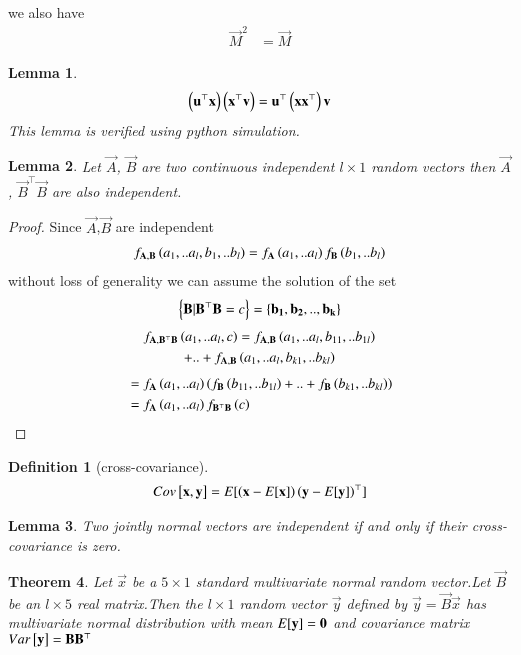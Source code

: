 \documentclass[journal,12pt,twocolumn]{IEEEtran}
\newtheorem{theorem}{Theorem}[section]
\newtheorem{lemma}[theorem]{Lemma}
\newtheorem{definition}{Definition}[section]
\begin{document}
we also have 
\begin{align}
    \vec{M}^2&=\vec{M}
\end{align}
\begin{lemma}
\label{l2.1}
\begin{align}
   \left(\mathbf{u}^{\top}\mathbf{x}\right)\left(\mathbf{x}^{\top}\mathbf{v}\right)=\mathbf{u}^{\top}\left(\mathbf{x}\mathbf{x}^{\top}\right)\mathbf{v}
\end{align}
This lemma is verified using python simulation.
\end{lemma}
\begin{lemma}
\label{l2.2}
Let $\vec{A}$, $\vec{B}$ are two continuous independent $l\times 1$ random vectors then $\vec{A}$, $\vec{B}^{\top}\vec{B}$ are also independent.
\end{lemma}
\begin{proof}
Since $\vec{A}$,$\vec{B}$ are independent
\begin{align}
 f_{\mathbf{A},\mathbf{B}}\left(a_1,..a_l,b_1,..b_l\right)=f_{\mathbf{A}}\left(a_1,..a_l\right)f_{\mathbf{B}}\left(b_1,..b_l\right)
\end{align}
without loss of generality we can assume the solution of the set
\begin{align}
    \left\{\mathbf{B}|\mathbf{B}^{\top}\mathbf{B}=c\right\}=\left\{\mathbf{b_1},\mathbf{b_2},..,\mathbf{b_k}\right\}
\end{align}
\begin{multline}
f_{\mathbf{A},\mathbf{B}^{\top}\mathbf{B}}\left(a_1,..a_l,c\right)=f_{\mathbf{A},\mathbf{B}}\left(a_1,..a_l,b_{11},..b_{1l}\right)\\+..+f_{\mathbf{A},\mathbf{B}}\left(a_1,..a_l,b_{k1},..b_{kl}\right)
\end{multline}
\begin{align}
&=f_{\mathbf{A}}\left(a_1,..a_l\right)\left(f_{\mathbf{B}}\left(b_{11},..b_{1l}\right)+..+f_{\mathbf{B}}\left(b_{k1},..b_{kl}\right)\right)\\
&=f_{\mathbf{A}}\left(a_1,..a_l\right)f_{\mathbf{B}^{\top}\mathbf{B}}\left(c\right)
\end{align}
\end{proof}
\begin{definition}[cross-covariance]
\begin{align}
    Cov{}\left[\mathbf{x},\mathbf{y}\right]=E[ \left(\mathbf{x}-E[ \mathbf{x} ]\right)\left(\mathbf{y}-E[ \mathbf{y} ]\right)^{\top} ]
\end{align}
\end{definition}
\begin{lemma}
Two jointly normal vectors are independent if and only if their cross-covariance is zero.
\end{lemma}
\begin{theorem}
\label{t2.2}
Let $\vec{x}$ be a $5\times 1$ standard multivariate normal random vector.Let $\vec{B}$ be an $l\times 5$ real matrix.Then the $l\times 1$ random vector $\vec{y}$ defined by $\vec{y}=\vec{B}\vec{x}$ has multivariate normal distribution with mean $E[ \mathbf{y} ]=\mathbf{0}$ and covariance matrix $Var{}\left[\mathbf{y}\right]=\mathbf{B}\mathbf{B}^{\top}$ 
\end{theorem}
\end{document}
